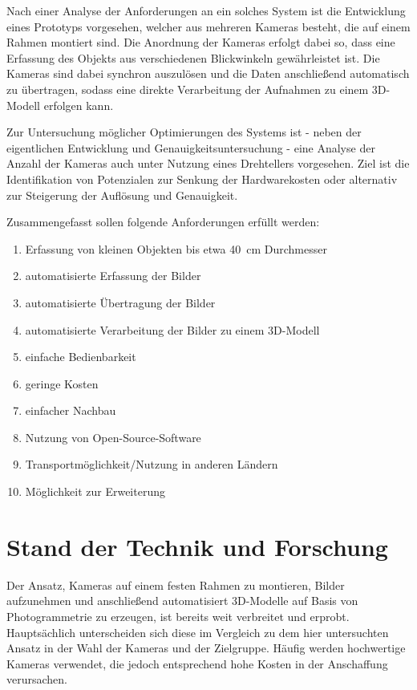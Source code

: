 \documentclass[./00PhotoBox]{subfiles}
\begin{document}
Nach einer Analyse der Anforderungen an ein solches System ist die Entwicklung eines Prototyps vorgesehen, welcher aus mehreren Kameras besteht, die auf einem Rahmen montiert sind. Die Anordnung der Kameras erfolgt dabei so, dass eine Erfassung des Objekts aus verschiedenen Blickwinkeln gewährleistet ist. Die Kameras sind dabei synchron auszulösen und die Daten anschließend au\-to\-ma\-tisch zu übertragen, sodass eine direkte Verarbeitung der Aufnahmen zu einem 3D-Modell erfolgen kann.

Zur Untersuchung möglicher Optimierungen des Systems ist - neben der eigentlichen Entwicklung und Genauigkeitsuntersuchung - eine Analyse der Anzahl der Kameras auch unter Nutzung eines Drehtellers vorgesehen. Ziel ist die Identifikation von Potenzialen zur Senkung der Hardwarekosten oder alternativ zur Steigerung der Auflösung und Genauigkeit.

Zusammengefasst sollen folgende Anforderungen erfüllt werden:

\begin{enumerate}
    \item Erfassung von kleinen Objekten bis etwa \SI{40}{\centi\metre} Durchmesser
    \item automatisierte Erfassung der Bilder
    \item automatisierte Übertragung der Bilder
    \item automatisierte Verarbeitung der Bilder zu einem 3D-Modell
    \item einfache Bedienbarkeit
    \item geringe Kosten
    \item einfacher Nachbau
    \item Nutzung von Open-Source-Software
    \item Transportmöglichkeit/Nutzung in anderen Ländern
    \item Möglichkeit zur Erweiterung
\end{enumerate}

\section{Stand der Technik und Forschung}
Der Ansatz, Kameras auf einem festen Rahmen zu montieren, Bilder aufzunehmen und anschließend automatisiert 3D-Modelle auf Basis von Photogrammetrie zu erzeugen, ist bereits weit verbreitet und erprobt. Hauptsächlich unterscheiden sich diese im Vergleich zu dem hier untersuchten Ansatz in der Wahl der Kameras und der Zielgruppe. Häufig werden hochwertige Kameras verwendet, die jedoch entsprechend hohe Kosten in der Anschaffung verursachen.
\end{document}
